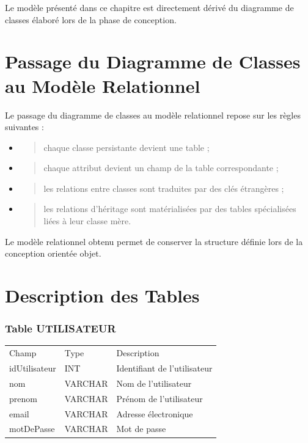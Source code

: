 Le modèle présenté dans ce chapitre est directement dérivé du diagramme
de classes élaboré lors de la phase de conception.

\hypertarget{passage-du-diagramme-de-classes-au-moduxe8le-relationnel}{%
\section{Passage du Diagramme de Classes au Modèle Relationnel}\label{passage-du-diagramme-de-classes-au-moduxe8le-relationnel}}

Le passage du diagramme de classes au modèle relationnel repose sur les
règles suivantes :

\begin{itemize}
\item
  \begin{quote}
  chaque classe persistante devient une table ;
  \end{quote}
\item
  \begin{quote}
  chaque attribut devient un champ de la table correspondante ;
  \end{quote}
\item
  \begin{quote}
  les relations entre classes sont traduites par des clés étrangères ;
  \end{quote}
\item
  \begin{quote}
  les relations d'héritage sont matérialisées par des tables
  spécialisées liées à leur classe mère.
  \end{quote}
\end{itemize}

Le modèle relationnel obtenu permet de conserver la structure définie
lors de la conception orientée objet.

\hypertarget{description-des-tables}{%
\section{Description des Tables}\label{description-des-tables}}

\hypertarget{table-utilisateur}{%
\subsubsection{Table UTILISATEUR}\label{table-utilisateur}}

\begin{longtable}[]{@{}lll@{}}
\toprule
\endhead
Champ & Type & Description \\
idUtilisateur & INT & Identifiant de l'utilisateur \\
nom & VARCHAR & Nom de l'utilisateur \\
prenom & VARCHAR & Prénom de l'utilisateur \\
email & VARCHAR & Adresse électronique \\
motDePasse & VARCHAR & Mot de passe \\
\bottomrule
\end{longtable}

